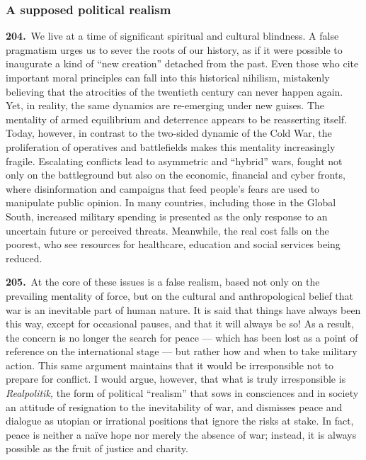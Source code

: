 \documentclass{article}
\begin{document}
\subsubsection{A supposed political realism}

\textbf{204.}\ We live at a time of significant spiritual and cultural blindness. A false pragmatism urges us to sever the roots of our history, as if it were possible to inaugurate a kind of ``new creation'' detached from the past. Even those who cite important moral principles can fall into this historical nihilism, mistakenly believing that the atrocities of the twentieth century can never happen again. Yet, in reality, the same dynamics are re-emerging under new guises. The mentality of armed equilibrium and deterrence appears to be reasserting itself. Today, however, in contrast to the two-sided dynamic of the Cold War, the proliferation of operatives and battlefields makes this mentality increasingly fragile. Escalating conflicts lead to asymmetric and ``hybrid'' wars, fought not only on the battleground but also on the economic, financial and cyber fronts, where disinformation and campaigns that feed people's fears are used to manipulate public opinion. In many countries, including those in the Global South, increased military spending is presented as the only response to an uncertain future or perceived threats. Meanwhile, the real cost falls on the poorest, who see resources for healthcare, education and social services being reduced.

\textbf{205.}\ At the core of these issues is a false realism, based not only on the prevailing mentality of force, but on the cultural and anthropological belief that war is an inevitable part of human nature. It is said that things have always been this way, except for occasional pauses, and that it will always be so! As a result, the concern is no longer the search for peace --- which has been lost as a point of reference on the international stage --- but rather how and when to take military action. This same argument maintains that it would be irresponsible not to prepare for conflict. I would argue, however, that what is truly irresponsible is \emph{Realpolitik,} the form of political ``realism'' that sows in consciences and in society an attitude of resignation to the inevitability of war, and dismisses peace and dialogue as utopian or irrational positions that ignore the risks at stake. In fact, peace is neither a naïve hope nor merely the absence of war; instead, it is always possible as the fruit of justice and charity.
\end{document}
